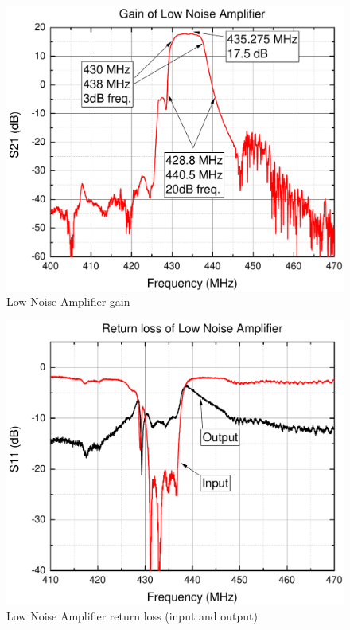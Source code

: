 \begin{figure}[H]
    \centering
    \includegraphics[width=0.42\paperwidth]{img/7/LnaGain.pdf}
    \caption{Low Noise Amplifier gain}
    \label{lna_gain}
\end{figure}
\begin{figure}[H]
    \centering
    \includegraphics[width=0.42\paperwidth]{img/7/LnaMatch.pdf}
    \caption{Low Noise Amplifier return loss (input and output)}
    \label{lna_match}
\end{figure}

